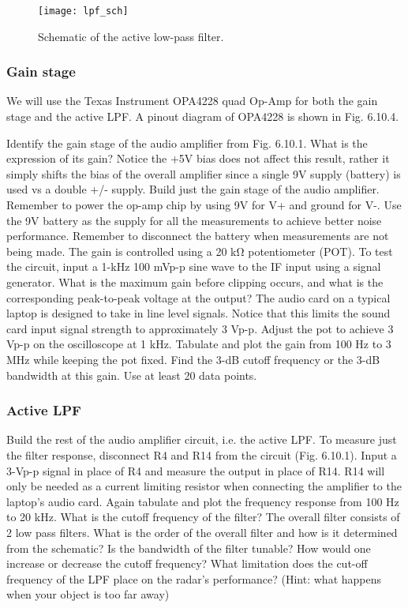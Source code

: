 \documentclass[letterpaper, 11pt]{article}
\begin{document}
\begin{figure}
	\centering
	\texttt{[image: lpf\_sch]}
	\caption{Schematic of the active low-pass filter.}
	\label{fig:lpf_pic}
\end{figure}


\subsubsection{Gain stage}

We will use the Texas Instrument OPA4228 quad Op-Amp for both the gain stage and the active LPF. A pinout diagram of OPA4228 is shown in Fig. 6.10.4.

Identify the gain stage of the audio amplifier from Fig. 6.10.1. What is the expression of its gain? Notice the +5V bias does not affect this result, rather it simply shifts the bias of the overall amplifier since a single 9V supply (battery) is used vs a double +/- supply.
Build just the gain stage of the audio amplifier. Remember to power the op-amp chip by using 9V for V+ and ground for V-. Use the 9V battery as the supply for all the measurements to achieve better noise performance. Remember to disconnect the battery when measurements are not being made.
The gain is controlled using a 20 kΩ potentiometer (POT). To test the circuit, input a 1-kHz 100 mVp-p sine wave to the IF input using a signal generator. What is the maximum gain before clipping occurs, and what is the corresponding peak-to-peak voltage at the output?
The audio card on a typical laptop is designed to take in line level signals. Notice that this limits the sound card input signal strength to approximately 3 Vp-p. Adjust the pot to achieve 3 Vp-p on the oscilloscope at 1 kHz. Tabulate and plot the gain from 100 Hz to 3 MHz while keeping the pot fixed. Find the 3-dB cutoff frequency or the 3-dB bandwidth at this gain. Use at least 20 data points.

\subsubsection{Active LPF}
Build the rest of the audio amplifier circuit, i.e. the active LPF. To measure just the filter response, disconnect R4 and R14 from the circuit (Fig. 6.10.1). Input a 3-Vp-p signal in place of R4 and measure the output in place of R14. R14 will only be needed as a current limiting resistor when connecting the amplifier to the laptop’s audio card. Again tabulate and plot the frequency response from 100 Hz to 20 kHz. What is the cutoff frequency of the filter?
The overall filter consists of 2 low pass filters. What is the order of the overall filter and how is it determined from the schematic? Is the bandwidth of the filter tunable? How would one increase or decrease the cutoff frequency?
What limitation does the cut-off frequency of the LPF place on the radar’s performance?  (Hint: what happens when your object is too far away)
\end{document}
